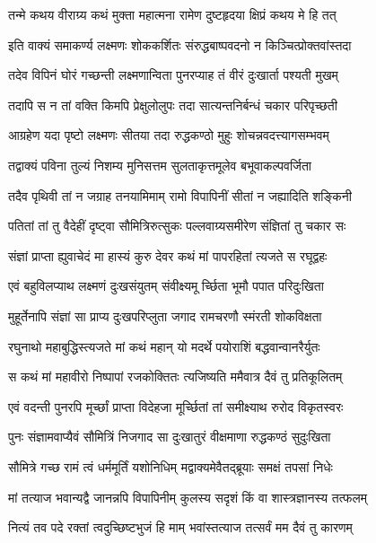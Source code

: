 \twolineshloka
{तन्मे कथय वीराग्र्य कथं मुक्ता महात्मना}
{रामेण दुष्टहृदया क्षिप्रं कथय मे हि तत्}%

\twolineshloka
{इति वाक्यं समाकर्ण्य लक्ष्मणः शोककर्शितः}
{संरुद्धबाष्पवदनो न किञ्चित्प्रोक्तवांस्तदा}%

\twolineshloka
{तदेव विपिनं घोरं गच्छन्ती लक्ष्मणान्विता}
{पुनरप्याह तं वीरं दुःखार्ता पश्यती मुखम्}%

\twolineshloka
{तदापि स न तां वक्ति किमपि प्रेक्षुलोलुपः}
{तदा सात्यन्तनिर्बन्धं चकार परिपृच्छती}%

\twolineshloka
{आग्रहेण यदा पृष्टो लक्ष्मणः सीतया तदा}
{रुद्धकण्ठो मुहुः शोचन्नवदत्त्यागसम्भवम्}%

\twolineshloka
{तद्वाक्यं पविना तुल्यं निशम्य मुनिसत्तम}
{सुलताकृत्तमूलेव बभूवाकल्पवर्जिता}%

\twolineshloka
{तदैव पृथिवी तां न जग्राह तनयामिमाम्}
{रामो विपापिनीं सीतां न जह्यादिति शङ्किनी}%

\twolineshloka
{पतितां तां तु वैदेहीं दृष्ट्वा सौमित्रिरुत्सुकः}
{पल्लवाग्र्यसमीरेण संज्ञितां तु चकार सः}%

\twolineshloka
{संज्ञां प्राप्ता ह्युवाचेदं मा हास्यं कुरु देवर}
{कथं मां पापरहितां त्यजते स रघूद्वहः}%

\twolineshloka
{एवं बहुविलप्याथ लक्ष्मणं दुःखसंयुतम्}
{संवीक्ष्यमू र्च्छिता भूमौ पपात परिदुःखिता}%

\twolineshloka
{मुहूर्तेनापि संज्ञां सा प्राप्य दुःखपरिप्लुता}
{जगाद रामचरणौ स्मंरती शोकविक्षता}%

\twolineshloka
{रघुनाथो महाबुद्धिस्त्यजते मां कथं महान्}
{यो मदर्थे पयोराशिं बद्धवान्वानरैर्युतः}%

\twolineshloka
{स कथं मां महावीरो निष्पापां रजकोक्तितः}
{त्यजिष्यति ममैवात्र दैवं तु प्रतिकूलितम्}%

\twolineshloka
{एवं वदन्ती पुनरपि मूर्च्छां प्राप्ता विदेहजा}
{मूर्च्छितां तां समीक्ष्याथ रुरोद विकृतस्वरः}%

\twolineshloka
{पुनः संज्ञामवाप्यैवं सौमित्रिं निजगाद सा}
{दुःखातुरं वीक्षमाणा रुद्धकण्ठं सुदुःखिता}%

\twolineshloka
{सौमित्रे गच्छ रामं त्वं धर्ममूर्तिं यशोनिधिम्}
{मद्वाक्यमेवैतद्ब्रूयाः समक्षं तपसां निधेः}%

\twolineshloka
{मां तत्याज भवान्यद्वै जानन्नपि विपापिनीम्}
{कुलस्य सदृशं किं वा शास्त्रज्ञानस्य तत्फलम्}%

\twolineshloka
{नित्यं तव पदे रक्तां त्वदुच्छिष्टभुजं हि माम्}
{भवांस्तत्याज तत्सर्वं मम दैवं तु कारणम्}%

